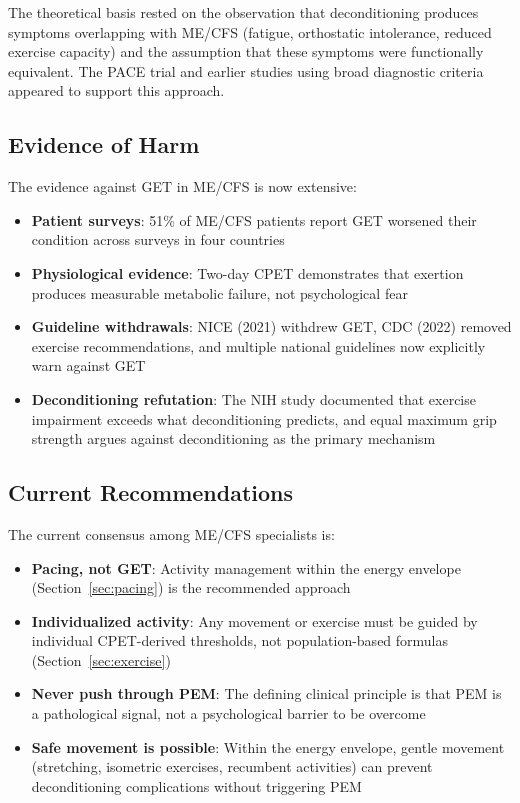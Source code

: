 The theoretical basis rested on the observation that deconditioning produces symptoms overlapping with ME/CFS (fatigue, orthostatic intolerance, reduced exercise capacity) and the assumption that these symptoms were functionally equivalent. The PACE trial and earlier studies using broad diagnostic criteria appeared to support this approach.

\subsection{Evidence of Harm}

The evidence against GET in ME/CFS is now extensive:

\begin{itemize}
    \item \textbf{Patient surveys}: 51\% of ME/CFS patients report GET worsened their condition across surveys in four countries~\cite{Kindlon2011GET}
    \item \textbf{Physiological evidence}: Two-day CPET demonstrates that exertion produces measurable metabolic failure, not psychological fear~\cite{keller2024cpet, Lim2020}
    \item \textbf{Guideline withdrawals}: NICE (2021) withdrew GET, CDC (2022) removed exercise recommendations, and multiple national guidelines now explicitly warn against GET~\cite{NICE2021mecfs}
    \item \textbf{Deconditioning refutation}: The NIH study documented that exercise impairment exceeds what deconditioning predicts, and equal maximum grip strength argues against deconditioning as the primary mechanism~\cite{walitt2024deep}
\end{itemize}

\subsection{Current Recommendations}

The current consensus among ME/CFS specialists is:

\begin{itemize}
    \item \textbf{Pacing, not GET}: Activity management within the energy envelope (Section~\ref{sec:pacing}) is the recommended approach
    \item \textbf{Individualized activity}: Any movement or exercise must be guided by individual CPET-derived thresholds, not population-based formulas (Section~\ref{sec:exercise})
    \item \textbf{Never push through PEM}: The defining clinical principle is that PEM is a pathological signal, not a psychological barrier to be overcome
    \item \textbf{Safe movement is possible}: Within the energy envelope, gentle movement (stretching, isometric exercises, recumbent activities) can prevent deconditioning complications without triggering PEM
\end{itemize}

